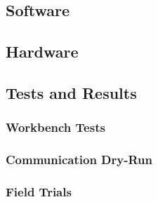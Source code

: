  {\small\textit{\lipsum[1-2]}}

\subsection{Software}
\label{sec:Integration_Software}

 {\small\textit{\lipsum[1-2]}}

\subsection{Hardware}
\label{sec:Integration_Hardware}

 {\small\textit{\lipsum[1-2]}}

\subsection{Tests and Results}
\label{sec:Integration_TestingWorkbench}

\subsubsection{Workbench Tests}

 {\small\textit{\lipsum[1-2]}}

\subsubsection{Communication Dry-Run}

 {\small\textit{\lipsum[1-2]}}

\subsubsection{Field Trials}

 {\small\textit{\lipsum[1-2]}}


